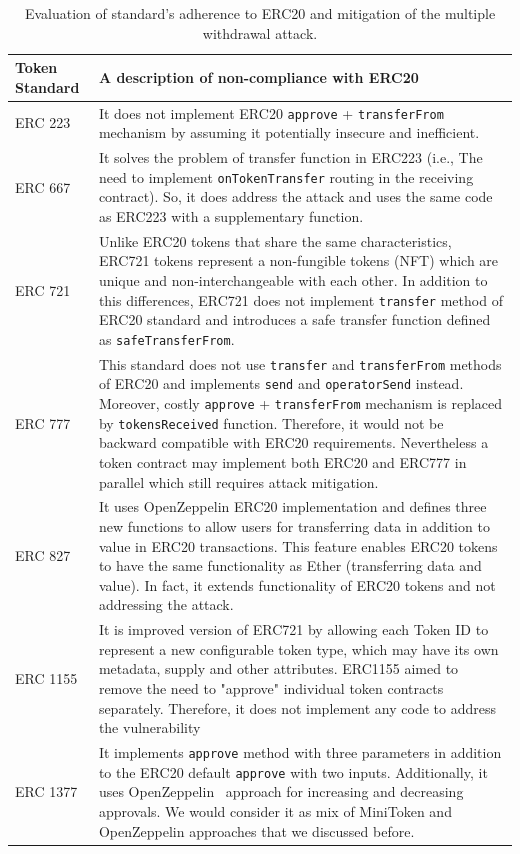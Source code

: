 \begin{table}
\centering
\begin{tabular}{|m{1.3cm}|m{15cm}|}
	\hline\centering
	Token Standard & A description of non-compliance with ERC20\\
	\hline\hline\centering
	ERC 223 \cite{Ref20} & It does not implement ERC20 \texttt{approve} + \texttt{transferFrom} mechanism by assuming it potentially insecure and inefficient.\\ 
	\hline\centering 
	ERC 667 \cite{Ref21} & It solves the problem of transfer function in ERC223 (i.e., The need to implement \texttt{onTokenTransfer} routing in the receiving contract). So, it does address the attack and uses the same code as ERC223 with a supplementary function.\\ 
	\hline\centering 
	ERC 721 \cite{Ref22} & Unlike ERC20 tokens that share the same characteristics, ERC721 tokens represent a non-fungible tokens (NFT) which are unique and non-interchangeable with each other. In addition to this differences, ERC721 does not implement \texttt{transfer} method of ERC20 standard and introduces a safe transfer function defined as \texttt{safeTransferFrom}.\\ 
	\hline\centering
	ERC 777 \cite{Ref23} & This standard does not use \texttt{transfer} and \texttt{transferFrom} methods of ERC20 and implements \texttt{send} and \texttt{operatorSend} instead. Moreover, costly \texttt{approve} + \texttt{transferFrom} mechanism is replaced by \texttt{tokensReceived} function. Therefore, it would not be backward compatible with ERC20 requirements. Nevertheless a token contract may implement both ERC20 and ERC777 in parallel which still requires attack mitigation.\\ 
	\hline\centering 
	ERC 827 \cite{Ref24} & It uses OpenZeppelin\cite{Ref10} ERC20 implementation and defines three new functions to allow users for transferring data in addition to value in ERC20 transactions. This feature enables ERC20 tokens to have the same functionality as Ether (transferring data and value). In fact, it extends functionality of ERC20 tokens and not addressing the attack. \\ 
	\hline\centering 
	ERC 1155 \cite{Ref25} & It is improved version of ERC721 by allowing each Token ID to represent a new configurable token type, which may have its own metadata, supply and other attributes. ERC1155 aimed to remove the need to "approve" individual token contracts separately. Therefore, it does not implement any code to address the vulnerability\\ 
	\hline\centering 
	ERC 1377 \cite{Ref26} & It implements \texttt{approve} method with three parameters in addition to the ERC20 default \texttt{approve} with two inputs. Additionally, it uses OpenZeppelin~\cite{Ref10} approach for increasing and decreasing approvals. We would consider it as mix of MiniToken and OpenZeppelin approaches that we discussed before.\\
	\hline
\end{tabular}
\newline
\caption{Evaluation of standard's adherence to ERC20 and mitigation of the multiple withdrawal attack.\label{tab:erc}}
\end{table}
